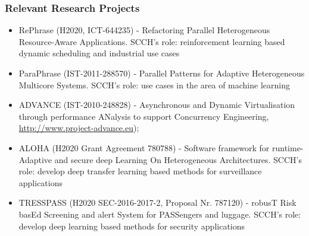 \documentclass[a4paper,11pt]{article}
\begin{document}
\begin{itemize}



\end{itemize}

\subsubsection*{Relevant Research Projects}

\begin{itemize}

\item RePhrase (H2020, ICT-644235) - Refactoring Parallel Heterogeneous Resource-Aware Applications. SCCH's role: reinforcement learning based dynamic scheduling and industrial use cases

\item ParaPhrase (IST-2011-288570) - Parallel Patterns for Adaptive Heterogeneous Multicore Systems. SCCH's role: use cases in the area of machine learning

\item ADVANCE (IST-2010-248828) - Asynchronous and Dynamic Virtualisation through performance ANalysis to support Concurrency Engineering, \url{http://www.project-advance.eu});

\item ALOHA (H2020 Grant Agreement 780788) - Software framework for runtime-Adaptive and secure deep Learning On Heterogeneous Architectures. SCCH's role: develop deep transfer learning based methods for surveillance applications

\item TRESSPASS (H2020 SEC-2016-2017-2, Proposal Nr. 787120) - robusT Risk basEd Screening and alert System for PASSengers and luggage. SCCH's role: develop deep learning based methods for security applications

\end{itemize}
\end{document}
